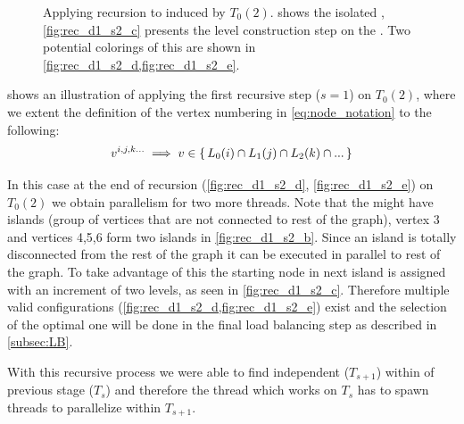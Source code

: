 \begin{figure}[thbp]
	     \hspace{1.75em}
     	\caption{Applying recursion to \subgraph induced by $T_0(2)$.  shows the isolated \subgraph, \cref{fig:rec_d1_s2_c} presents the level construction step on the \subgraph. Two potential \DONE colorings of this  \subgraph are shown in \cref{fig:rec_d1_s2_d,fig:rec_d1_s2_e}.}
     	
     	\label{fig:rec_d1_s2}
     \end{figure}
     
      shows an illustration of applying the first recursive step ($s=1$) on $T_0(2)$, where we extent the definition of the vertex numbering in \cref{eq:node_notation} to the following:
	 \begin{equation}
	    v^{i,j,k...} \implies v \in \set{L_0(i) \cap L_1(j) \cap L_2(k) \cap ...} 
	 \end{equation}
	 
     In this case at the end of recursion (\cf \cref{fig:rec_d1_s2_d}, \cref{fig:rec_d1_s2_e}) on $T_0(2)$ we obtain parallelism for two more threads. Note that the \subgraphs might have islands (group of vertices that are not connected to rest of the graph), \eg vertex 3 and vertices 4,5,6 form two islands in \cref{fig:rec_d1_s2_b}. Since an island is totally disconnected from the rest of the graph it can be executed in parallel to rest of the graph. To take advantage of this the starting node in next island is assigned with an increment of two levels, as seen in \cref{fig:rec_d1_s2_c}. Therefore multiple valid \DONE configurations (\cf \cref{fig:rec_d1_s2_d,fig:rec_d1_s2_e}) exist and the selection of the optimal one will be done in the final load balancing step as described in \cref{subsec:LB}.    
     
     With this recursive process we were able to find independent \levelGroups ($T_{s+1}$) within \levelGroup of previous stage ($T_s$) and therefore the thread which works on $T_s$ has to spawn threads to parallelize within $T_{s+1}$.
     
